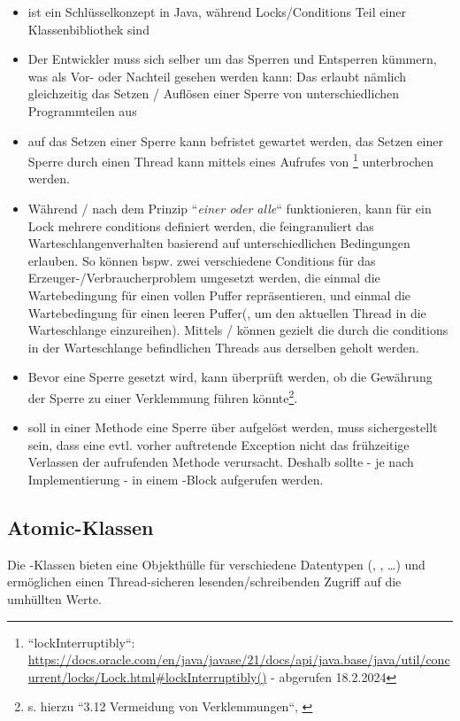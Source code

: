 \begin{tcolorbox}[title={Vor- und Nachteile von locks u. conditions}]
\begin{itemize}
    \item {} ist ein Schlüsselkonzept in Java, während Locks/Conditions Teil einer Klassenbibliothek sind
    \item Der Entwickler muss sich selber um das Sperren und Entsperren kümmern, was als Vor- oder Nachteil gesehen werden kann:
    Das erlaubt nämlich gleichzeitig das Setzen / Auflösen einer Sperre von unterschiedlichen Programmteilen aus
    \item auf das Setzen einer Sperre kann befristet gewartet werden, das Setzen einer Sperre durch einen Thread kann mittels eines Aufrufes von \footnote{
        ``lockInterruptibly``: \url{https://docs.oracle.com/en/java/javase/21/docs/api/java.base/java/util/concurrent/locks/Lock.html#lockInterruptibly()} - abgerufen 18.2.2024
    } unterbrochen werden.
    \item Während / nach dem Prinzip ``\textit{einer oder alle}`` funktionieren, kann für ein Lock mehrere conditions definiert werden, die feingranuliert das Warteschlangenverhalten basierend auf unterschiedlichen Bedingungen erlauben.
     So können bspw. zwei verschiedene Conditions für das Erzeuger-/Verbraucherproblem umgesetzt werden, die einmal die Wartebedingung für einen vollen Puffer repräsentieren, und einmal die Wartebedingung für einen leeren Puffer(, um den aktuellen Thread in die Warteschlange einzureihen).
     Mittels  /  können gezielt die durch die conditions in der Warteschlange befindlichen Threads aus derselben geholt werden.
    \item Bevor eine Sperre gesetzt wird, kann überprüft werden, ob die Gewährung der Sperre zu einer Verklemmung führen könnte\footnote{s. hierzu ``3.12 Vermeidung von Verklemmungen``, \cite[192 ff.]{Oec22}}.
    \item soll in einer Methode eine Sperre über  aufgelöst werden, muss sichergestellt sein, dass eine evtl. vorher auftretende Exception nicht das frühzeitige Verlassen der aufrufenden Methode verursacht.
    Deshalb sollte  - je nach Implementierung - in einem -Block aufgerufen werden.
\end{itemize}
\end{tcolorbox}

\subsection*{Atomic-Klassen}
Die -Klassen bieten eine Objekthülle für verschiedene Datentypen (, , \ldots) und ermöglichen einen Thread-sicheren lesenden/schreibenden Zugriff auf die umhüllten Werte.\\

